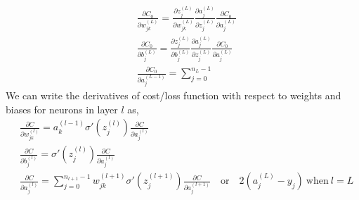 \begin{equation}
    \label{eq:bp_eq_d}
    \begin{aligned}
        &\frac{\partial C_0}{\partial w_{jk}^{(L)}} = \frac{\partial z_j^{(L)}}{\partial w_{jk}^{(L)}} \frac{\partial a_j^{(L)}}{\partial z_j^{(L)}}\frac{\partial C_0}{\partial a_j^{(L)}}\\
        &\frac{\partial C_0}{\partial b_j^{(L)}} = \frac{\partial z_j^{(L)}}{\partial b_j^{(L)}} \frac{\partial a_j^{(L)}}{\partial z_j^{(L)}}\frac{\partial C_0}{\partial a_j^{(L)}}\\
        &\frac{\partial C_0}{\partial a_j^{(L-1)}} = \sum_{j=0}^{n_{L} -1} 
    \end{aligned}
\end{equation}
We can write the derivatives of cost/loss function with respect to weights and biases for neurons in layer $l$ as,
\begin{equation}
    \label{eq:bp_eq}
    \begin{aligned}
        &\frac{\partial C}{\partial w_{jk}^{(l)}} = a_k^{(l-1)}\sigma'(z_j^{(l)}) \frac{\partial C}{\partial a_j^{(l)}}\\
        &\frac{\partial C}{\partial b_j^{(l)}} = \sigma'(z_j^{(l)}) \frac{\partial C}{\partial a_j^{(l)}}\\
        &\frac{\partial C}{\partial a_j^{(l)}} = \sum_{j=0}^{n_{l+1} -1} w_{jk}^{(l+1)} \sigma'(z_j^{(l+1)}) \frac{\partial C}{\partial a_j^{(l+1)}} \quad \text{or} \quad  2(a_j^{(L)} - y_j) \ \text{when} \ l=L
    \end{aligned}
\end{equation}
